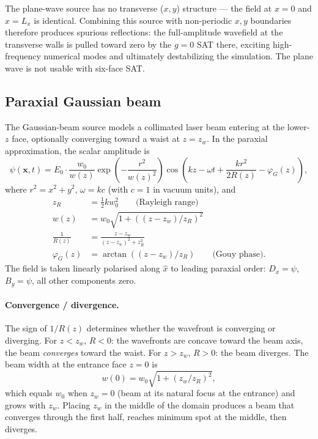 \documentclass[11pt]{article}
\newcommand{\vx}{\mathbf{x}}
\newcommand{\hx}{\hat{x}}
\begin{document}
The plane-wave source has no transverse ($x, y$) structure —
the field at $x = 0$ and $x = L_x$ is identical. Combining this source
with non-periodic $x, y$ boundaries therefore produces spurious
reflections: the full-amplitude wavefield at the transverse walls is
pulled toward zero by the $g = 0$ SAT there, exciting high-frequency
numerical modes and ultimately destabilizing the simulation. The plane
wave is not usable with six-face SAT.

\subsection{Paraxial Gaussian beam}
\label{sec:gaussian-beam}

The Gaussian-beam source models a collimated laser beam entering at the
lower-$z$ face, optionally converging toward a waist at $z = z_w$. In
the paraxial approximation, the scalar amplitude is
\begin{equation}
  \psi(\vx, t) = E_0 \cdot \frac{w_0}{w(z)} \exp\!\left( -\frac{r^2}{w(z)^2} \right)
    \cos\!\left( k z - \omega t + \frac{k r^2}{2 R(z)} - \varphi_G(z) \right),
  \label{eq:gauss-amp}
\end{equation}
where $r^2 = x^2 + y^2$, $\omega = k c$ (with $c = 1$ in vacuum units),
and
\begin{align}
  z_R &= \tfrac{1}{2} k w_0^2 \qquad \text{(Rayleigh range)} \\
  w(z)       &= w_0 \sqrt{1 + ((z - z_w)/z_R)^2} \\
  \frac{1}{R(z)} &= \frac{z - z_w}{(z - z_w)^2 + z_R^2} \\
  \varphi_G(z) &= \arctan((z - z_w)/z_R) \qquad \text{(Gouy phase)}.
\end{align}
The field is taken linearly polarised along $\hx$ to leading paraxial
order: $D_x = \psi$, $B_y = \psi$, all other components zero.

\paragraph{Convergence / divergence.} The sign of $1/R(z)$ determines
whether the wavefront is converging or diverging. For $z < z_w$,
$R < 0$: the wavefronts are concave toward the beam axis, the beam
\emph{converges} toward the waist. For $z > z_w$, $R > 0$: the beam
diverges. The beam width at the entrance face $z = 0$ is
\begin{equation}
  w(0) = w_0 \sqrt{1 + (z_w/z_R)^2},
\end{equation}
which equals $w_0$ when $z_w = 0$ (beam at its natural focus at the
entrance) and grows with $z_w$. Placing $z_w$ in the middle of the
domain produces a beam that converges through the first half, reaches
minimum spot at the middle, then diverges.
\end{document}
